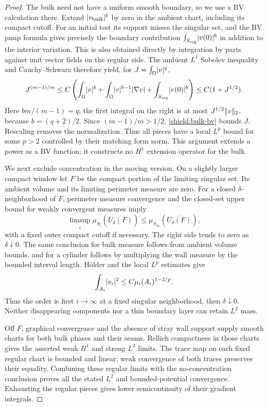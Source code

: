 \begin{proof}
The bulk need not have a uniform smooth boundary, so we use a BV
calculation there.  Extend $\lvert v_{\rm bulk}\rvert^b$ by zero in the ambient
chart, including its compact cutoff.  For an initial test its support
misses the singular set, and the BV jump formula gives precisely the
boundary contribution $\int_{S_{\rm reg}}\lvert v(0)\rvert^b$ in addition to the
interior variation.  This is also obtained directly by integration by
parts against unit vector fields on the regular side.  The ambient
$L^1$ Sobolev inequality and Cauchy--Schwarz therefore yield, for
$J=\int_\Omega\lvert v\rvert^q$,
\begin{equation}\label{shield:bulk-bv}
 J^{(m-1)/m}
 \le C\left(
       \int_\Omega\lvert v\rvert^b+
       \int_\Omega\lvert v\rvert^{b-1}\lvert\nabla v\rvert
       +\int_{S_{\rm reg}}\lvert v(0)\rvert^b\right)
 \le C(1+J^{1/2}).
\end{equation}
Here $bm/(m-1)=q$; the first integral on the right is at most
$J^{1/2}\lVert v\rVert_2$, because $b=(q+2)/2$.  Since $(m-1)/m>1/2$, \cref{shield:bulk-bv} bounds $J$.
Rescaling removes the normalization.  Thus all pieces have a local
$L^p$ bound for some $p>2$ controlled by their matching form norm.
This argument extends a power as a BV function; it constructs no
$H^1$ extension operator for the bulk.

We next exclude concentration in the moving version.  On a slightly
larger compact window let $F$ be the compact portion of the limiting
singular set.  Its ambient volume and its limiting perimeter measure
are zero.  For a closed $\delta$-neighborhood of $F$, perimeter measure
convergence and the closed-set upper bound for weakly convergent
measures imply
\[
 \limsup_i\mu_{S_i}(\overline{U_\delta(F)})
       \le \mu_{S_\infty}(\overline{U_\delta(F)}),
\]
with a fixed outer compact cutoff if necessary.  The right side tends
to zero as $\delta\downarrow0$.  The same conclusion for bulk measure
follows from ambient volume bounds, and for a cylinder follows by
multiplying the wall measure by the bounded interval length.  H\"older
and the local $L^p$ estimates give
\[
 \int_{A_i}\lvert v_i\rvert^2
 \le C\mu_i(A_i)^{1-2/p}.
\]
Thus the order is first $i\to\infty$ at a fixed singular neighborhood,
then $\delta\downarrow0$.  Neither disappearing components nor a thin
boundary layer can retain $L^2$ mass.

Off $F$, graphical convergence and the absence of stray wall support
supply smooth charts for both bulk phases and their seams.  Rellich
compactness in those charts gives the asserted weak $H^1$ and strong
$L^2$ limits.  The trace map on each fixed regular chart is bounded and
linear; weak convergence of both traces preserves their equality.
Combining these regular limits with the no-concentration conclusion
proves all the stated $L^2$ and bounded-potential convergence.  Exhausting
the regular pieces gives lower semicontinuity of their gradient
integrals.


\end{proof}
